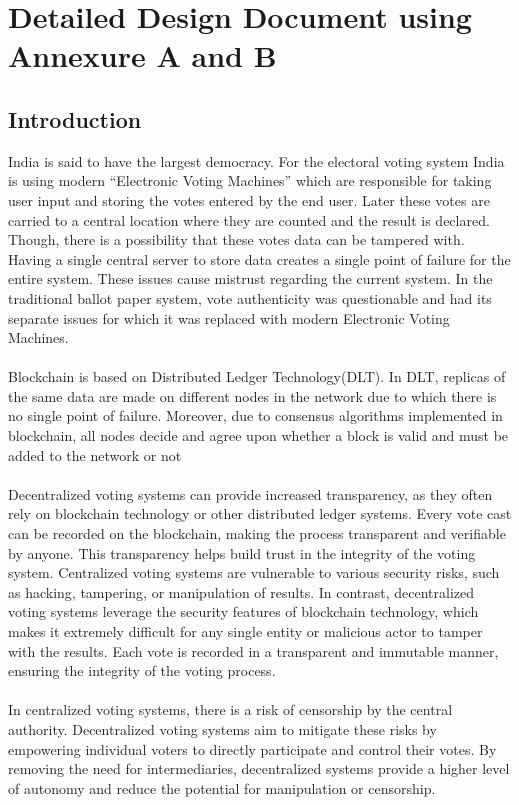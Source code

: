 \documentclass[oneside, 12pt]{book}
\begin{document}
\section{Detailed Design Document using Annexure A and B}
\newpage
\subsection{Introduction}
India is said to have the largest democracy. For the electoral voting system India is using modern “Electronic Voting Machines” which are responsible for taking user input and storing the votes entered by the end user. Later these votes are carried to a central location where they are counted and the result is declared. Though, there is a possibility that these votes data can be tampered with. Having a single central server to store data creates a single point of failure for the entire system. These issues cause mistrust regarding the current system. In the traditional ballot paper system, vote authenticity was questionable and had its separate issues for which it was replaced with modern Electronic Voting Machines.
\\\\Blockchain is based on Distributed Ledger Technology(DLT). In DLT, replicas of the same data are made on different nodes in the network due to which there is no single point of failure. Moreover, due to consensus algorithms implemented in blockchain, all nodes decide and agree upon whether a block is valid and must be added to the network or not
\\\\Decentralized voting systems can provide increased transparency, as they often rely on blockchain technology or other distributed ledger systems. Every vote cast can be recorded on the blockchain, making the process transparent and verifiable by anyone. This transparency helps build trust in the integrity of the voting system.  Centralized voting systems are vulnerable to various security risks, such as hacking, tampering, or manipulation of results. In contrast, decentralized voting systems leverage the security features of blockchain technology, which makes it extremely difficult for any single entity or malicious actor to tamper with the results. Each vote is recorded in a transparent and immutable manner, ensuring the integrity of the voting process.
\\\\In centralized voting systems, there is a risk of censorship by the central authority. Decentralized voting systems aim to mitigate these risks by empowering individual voters to directly participate and control their votes. By removing the need for intermediaries, decentralized systems provide a higher level of autonomy and reduce the potential for manipulation or censorship.
\end{document}
